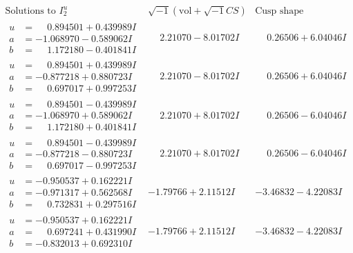 \documentclass[1p]{elsarticle_modified}
\theoremstyle{definition}
\newcommand{\I}{\sqrt{-1}}
\begin{document}
$$\begin{array}{c|c|c}  
\text{Solutions to }I^u_{2}& \I (\text{vol} + \sqrt{-1}CS) & \text{Cusp shape}\\
 \hline 
\begin{aligned}
u &= \phantom{-}0.894501 + 0.439989 I \\
a &= -1.068970 - 0.589062 I \\
b &= \phantom{-}1.172180 - 0.401841 I\end{aligned}
 & \phantom{-}2.21070 - 8.01702 I & \phantom{-}0.26506 + 6.04046 I \\ \hline\begin{aligned}
u &= \phantom{-}0.894501 + 0.439989 I \\
a &= -0.877218 + 0.880723 I \\
b &= \phantom{-}0.697017 + 0.997253 I\end{aligned}
 & \phantom{-}2.21070 - 8.01702 I & \phantom{-}0.26506 + 6.04046 I \\ \hline\begin{aligned}
u &= \phantom{-}0.894501 - 0.439989 I \\
a &= -1.068970 + 0.589062 I \\
b &= \phantom{-}1.172180 + 0.401841 I\end{aligned}
 & \phantom{-}2.21070 + 8.01702 I & \phantom{-}0.26506 - 6.04046 I \\ \hline\begin{aligned}
u &= \phantom{-}0.894501 - 0.439989 I \\
a &= -0.877218 - 0.880723 I \\
b &= \phantom{-}0.697017 - 0.997253 I\end{aligned}
 & \phantom{-}2.21070 + 8.01702 I & \phantom{-}0.26506 - 6.04046 I \\ \hline\begin{aligned}
u &= -0.950537 + 0.162221 I \\
a &= -0.971317 + 0.562568 I \\
b &= \phantom{-}0.732831 + 0.297516 I\end{aligned}
 & -1.79766 + 2.11512 I & -3.46832 - 4.22083 I \\ \hline\begin{aligned}
u &= -0.950537 + 0.162221 I \\
a &= \phantom{-}0.697241 + 0.431990 I \\
b &= -0.832013 + 0.692310 I\end{aligned}
 & -1.79766 + 2.11512 I & -3.46832 - 4.22083 I \\ \hline\begin{aligned}

\end{aligned}
\end{array}$$
\end{document}
